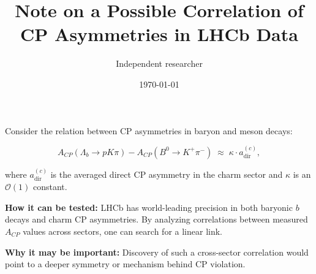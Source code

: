 \documentclass[12pt,a4paper]{article}
\title{Note on a Possible Correlation of CP Asymmetries in LHCb Data}
\author{Independent researcher}
\date{\today}
\begin{document}
\maketitle

\noindent
Consider the relation between CP asymmetries in baryon and meson decays:

\[
A_{CP}(\Lambda_b\to pK\pi) - A_{CP}(B^0\to K^+\pi^-) \;\approx\; \kappa \cdot a_{\text{dir}}^{(c)},
\]

where $a_{\text{dir}}^{(c)}$ is the averaged direct CP asymmetry in the charm sector and $\kappa$ is an $\mathcal{O}(1)$ constant.

\textbf{How it can be tested:}  
LHCb has world-leading precision in both baryonic $b$ decays and charm CP asymmetries. By analyzing correlations between measured $A_{CP}$ values across sectors, one can search for a linear link.

\textbf{Why it may be important:}  
Discovery of such a cross-sector correlation would point to a deeper symmetry or mechanism behind CP violation.
\end{document}
